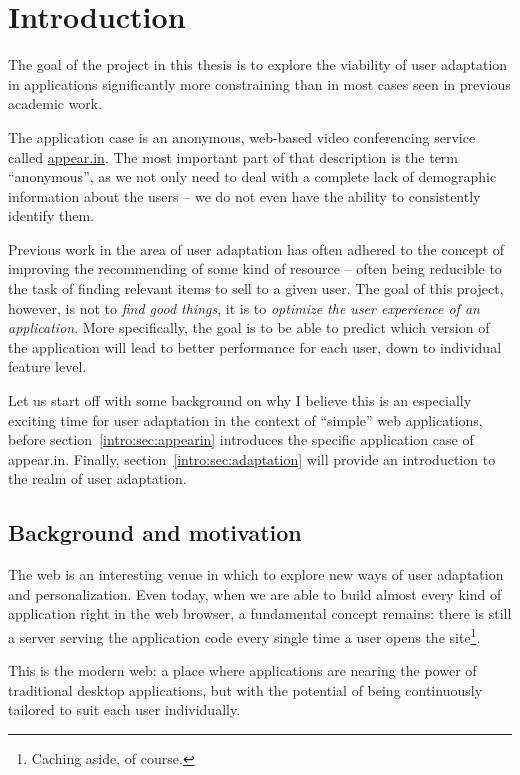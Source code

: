 \chapter{Introduction}

\label{Chapter1}


The goal of the project in this thesis is to explore the viability of user adaptation in applications significantly more constraining than in most cases seen in previous academic work.

The application case is an anonymous, web-based video conferencing service called \url{appear.in}. The most important part of that description is the term ``anonymous'', as we not only need to deal with a complete lack of demographic information about the users -- we do not even have the ability to consistently identify them.

Previous work in the area of user adaptation has often adhered to the concept of improving the recommending of some kind of resource -- often being reducible to the task of finding relevant items to sell to a given user. The goal of this project, however, is not to \emph{find good things}, it is to \emph{optimize the user experience of an application}. More specifically, the goal is to be able to predict which version of the application will lead to better performance for each user, down to individual feature level.

Let us start off with some background on why I believe this is an especially exciting time for user adaptation in the context of ``simple'' web applications, before section~\ref{intro:sec:appearin} introduces the specific application case of appear.in. Finally, section~\ref{intro:sec:adaptation} will provide an introduction to the realm of user adaptation.

\section{Background and motivation}
\label{intro:sec:motivation}

The web is an interesting venue in which to explore new ways of user adaptation and personalization. Even today, when we are able to build almost every kind of application right in the web browser, a fundamental concept remains: there is still a server serving the application code every single time a user opens the site\footnote{Caching aside, of course.}.

This is the modern web: a place where applications are nearing the power of traditional desktop applications, but with the potential of being continuously tailored to suit each user individually.

